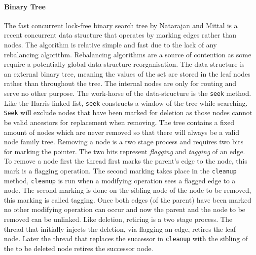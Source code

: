 \paragraph{Binary Tree} The fast concurrent lock-free binary search tree by Natarajan and Mittal is a recent concurrent data structure that operates by marking edges rather than nodes.\cite{LFBinaryTree} The algorithm is relative simple and fast due to the lack of any rebalancing algorithm. Rebalancing algorithms are a source of contention as some require a potentially global data-structure reorganisation. The data-structure is an external binary tree, meaning the values of the set are stored in the leaf nodes rather than throughout the tree. The internal nodes are only for routing and serve no other purpose. The work-horse of the data-structure is the \texttt{seek} method. Like the Harris linked list, \texttt{seek} constructs a window of the tree while searching. \texttt{Seek} will exclude nodes that have been marked for deletion as those nodes cannot be valid ancestors for replacement when removing. The tree contains a fixed amount of nodes which are never removed so that there will always be a valid node family tree. Removing a node is a two stage process and requires two bits for marking the pointer. The two bits represent \textit{flagging} and \textit{tagging} of an edge. To remove a node first the thread first marks the parent's edge to the node, this mark is a flagging operation. The second marking takes place in the \texttt{cleanup} method, \texttt{cleanup} is run when a modifying operation sees a flagged edge to a node. The second marking is done on the sibling node of the node to be removed, this marking is called tagging. Once both edges (of the parent) have been marked no other modifying operation can occur and now the parent and the node to be removed can be unlinked. Like deletion, retiring is a two stage process. The thread that initially injects the deletion, via flagging an edge, retires the leaf node. Later the thread that replaces the successor in \texttt{cleanup} with the sibling of the to be deleted node retires the successor node.


